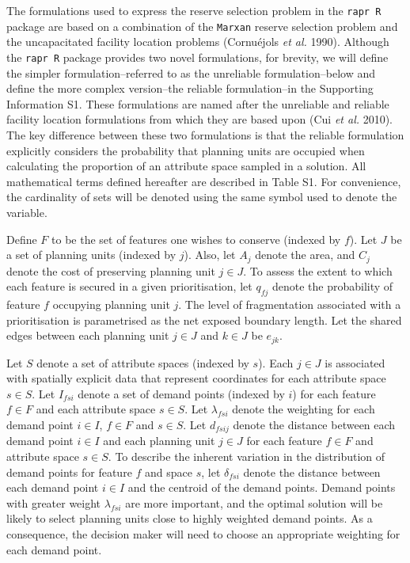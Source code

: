 \documentclass[11pt,]{article}
\begin{document}
The formulations used to express the reserve selection problem in the
\texttt{rapr R} package are based on a combination of the
\texttt{Marxan} reserve selection problem and the uncapacitated facility
location problems (Cornu{é}jols \emph{et al.} 1990). Although the
\texttt{rapr R} package provides two novel formulations, for brevity, we
will define the simpler formulation--referred to as the unreliable
formulation--below and define the more complex version--the reliable
formulation--in the Supporting Information S1. These formulations are
named after the unreliable and reliable facility location formulations
from which they are based upon (Cui \emph{et al.} 2010). The key
difference between these two formulations is that the reliable
formulation explicitly considers the probability that planning units are
occupied when calculating the proportion of an attribute space sampled
in a solution. All mathematical terms defined hereafter are described in
Table S1. For convenience, the cardinality of sets will be denoted using
the same symbol used to denote the variable.

Define $F$ to be the set of features one wishes to conserve (indexed by
$f$). Let $J$ be a set of planning units (indexed by $j$). Also, let
$A_j$ denote the area, and $C_j$ denote the cost of preserving planning
unit $j \in J$. To assess the extent to which each feature is secured in
a given prioritisation, let $q_{fj}$ denote the probability of feature
$f$ occupying planning unit $j$. The level of fragmentation associated
with a prioritisation is parametrised as the net exposed boundary
length. Let the shared edges between each planning unit $j \in J$ and
$k \in J$ be $e_{jk}$.

Let $S$ denote a set of attribute spaces (indexed by $s$). Each
$j \in J$ is associated with spatially explicit data that represent
coordinates for each attribute space $s \in S$. Let $I_{fsi}$ denote a
set of demand points (indexed by $i$) for each feature $f \in F$ and
each attribute space $s \in S$. Let $\lambda_{fsi}$ denote the weighting
for each demand point $i \in I$, $f \in F$ and $s \in S$. Let $d_{fsij}$
denote the distance between each demand point $i \in I$ and each
planning unit $j \in J$ for each feature $f \in F$ and attribute space
$s \in S$. To describe the inherent variation in the distribution of
demand points for feature $f$ and space $s$, let $\delta_{fsi}$ denote
the distance between each demand point $i \in I$ and the centroid of the
demand points. Demand points with greater weight $\lambda_{fsi}$ are
more important, and the optimal solution will be likely to select
planning units close to highly weighted demand points. As a consequence,
the decision maker will need to choose an appropriate weighting for each
demand point.
\end{document}
